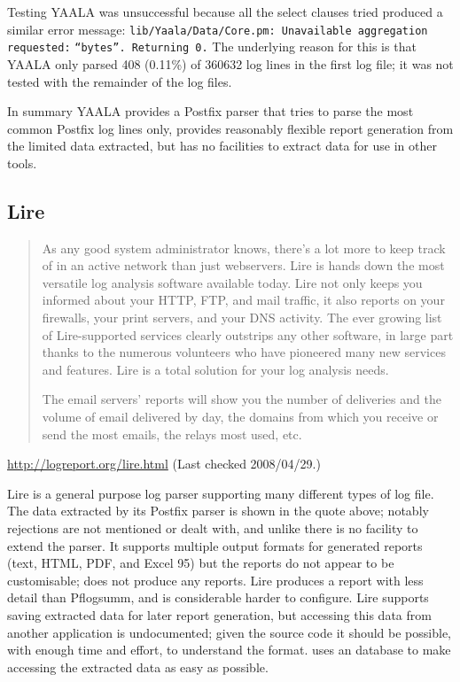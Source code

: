 Testing YAALA was unsuccessful because all the select clauses tried
produced a similar error message:
\newline{}\tab{}\texttt{lib/Yaala/Data/Core.pm: Unavailable aggregation
requested:} \newline{}\tab{}\tab{}\texttt{``bytes''. Returning 0.}
\newline{}  The underlying reason for this is that YAALA only parsed 408
(0.11\%) of 360632 log lines in the first log file; it was not tested with
the remainder of the \numberOFlogFILES{} log files.

In summary YAALA provides a Postfix parser that tries to parse the most
common Postfix log lines only, provides reasonably flexible report
generation from the limited data extracted, but has no facilities to
extract data for use in other tools.

\subsection{Lire}

\begin{quotation}

    As any good system administrator knows, there's a lot more to keep
    track of in an active network than just webservers. Lire is hands down
    the most versatile log analysis software available today. Lire not only
    keeps you informed about your HTTP, FTP, and mail traffic, it also
    reports on your firewalls, your print servers, and your DNS activity.
    The ever growing list of Lire-supported services clearly outstrips any
    other software, in large part thanks to the numerous volunteers who
    have pioneered many new services and features. Lire is a total solution
    for your log analysis needs.

    The email servers' reports will show you the number of deliveries and
    the volume of email delivered by day, the domains from which you
    receive or send the most emails, the relays most used, etc.

\end{quotation}

\noindent{}\url{http://logreport.org/lire.html} \newline{}
(Last checked 2008/04/29.)

Lire is a general purpose log parser supporting many different types of log
file.  The data extracted by its Postfix parser is shown in the quote
above; notably rejections are not mentioned or dealt with, and unlike
\parsername{} there is no facility to extend the parser.  It supports
multiple output formats for generated reports (text, HTML, PDF, and Excel
95) but the reports do not appear to be customisable; \parsername{} does
not produce any reports.  Lire produces a report with less detail than
Pflogsumm, and is considerable harder to configure.  Lire supports saving
extracted data for later report generation, but accessing this data from
another application is undocumented; given the source code it should be
possible, with enough time and effort, to understand the format.
\parsername{} uses an \SQL{} database to make accessing the extracted data
as easy as possible.  

